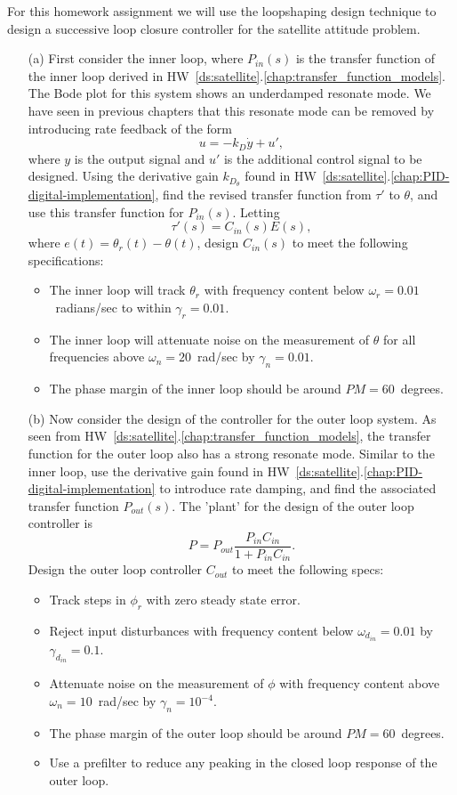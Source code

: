 For this homework assignment we will use the loopshaping design technique to design a successive loop closure controller for the satellite attitude problem.
\begin{itemize}
	\item[(a)] First consider the inner loop, where $P_{in}(s)$ is the transfer function of the inner loop derived in HW~\ref{ds:satellite}.\ref{chap:transfer_function_models}.  The Bode plot for this system shows an underdamped resonate mode.  We have seen in previous chapters that this resonate mode can be removed by introducing rate feedback of the form
		\[
		u = - k_D \dot{y} + u',
		\] 
		where $y$ is the output signal and $u'$ is the additional control signal to be designed.
	  Using the derivative gain $k_{D_\theta}$ found in HW~\ref{ds:satellite}.\ref{chap:PID-digital-implementation}, find the revised transfer function from $\tau'$ to $\theta$, and use this transfer function for $P_{in}(s)$.  Letting 
	  \[
	  \tau'(s) = C_{in}(s) E(s),
	  \]
	  where $e(t) = \theta_r(t)-\theta(t)$, design $C_{in}(s)$ to meet the following specifications:
	  \begin{itemize}
	  \item The inner loop will track $\theta_r$ with frequency content below $\omega_r=0.01$~radians/sec to within $\gamma_r=0.01$.
	  \item The inner loop will attenuate noise on the measurement of $\theta$ for all frequencies above $\omega_n=20$~rad/sec by $\gamma_n=0.01$.
	  \item The phase margin of the inner loop should be around $PM=60$~degrees.
	  \end{itemize}
	\item[(b)] Now consider the design of the controller for the outer loop system.  As seen from HW~\ref{ds:satellite}.\ref{chap:transfer_function_models}, the transfer function for the outer loop also has a strong resonate mode.  Similar to the inner loop, use the derivative gain  found in HW~\ref{ds:satellite}.\ref{chap:PID-digital-implementation} to introduce rate damping, and find the associated transfer function $P_{out}(s)$.  	The 'plant' for the design of the outer loop controller is
		\[
		P = P_{out}\frac{P_{in}C_{in}}{1+P_{in}C_{in}}.
		\]
		Design the outer loop controller $C_{out}$ to meet the following specs:
		\begin{itemize}
		\item Track steps in $\phi_r$ with zero steady state error.
		\item Reject input disturbances with frequency content below $\omega_{d_{in}}=0.01$ by $\gamma_{d_{in}}=0.1$.
		\item Attenuate noise on the measurement of $\phi$ with frequency content above $\omega_n=10$~rad/sec by $\gamma_n=10^{-4}$.
		\item 	The phase margin of the outer loop should be around $PM=60$~degrees.
		\item Use a prefilter to reduce any peaking in the closed loop response of the outer loop.
		\end{itemize}
		
\end{itemize}


